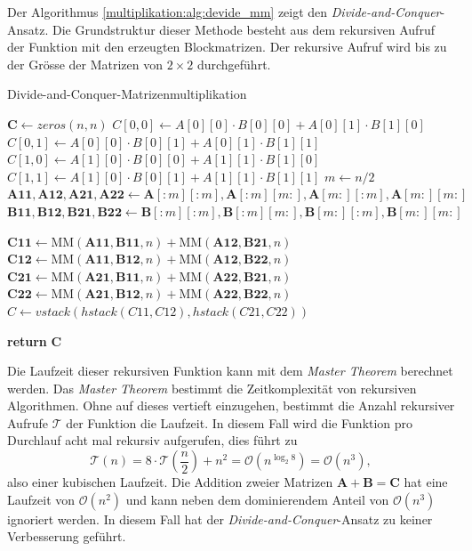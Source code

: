 Der Algorithmus \ref{multiplikation:alg:devide_mm} zeigt den \textit{Divide-and-Conquer}-Ansatz.
Die Grundstruktur dieser Methode besteht aus dem rekursiven Aufruf der Funktion mit den erzeugten Blockmatrizen.
Der rekursive Aufruf wird bis zu der Gr\"osse der Matrizen von $2 \times 2$ durchgef\"uhrt.
\begin{algorithm}\footnotesize\caption{Divide-and-Conquer-Matrizenmultiplikation}
	\setlength{\lineskip}{7pt}
	\label{multiplikation:alg:devide_mm}
	\begin{algorithmic}
		\State  $ \mathbf{C} \gets zeros(n, n)$
		\State  $C[0, 0] \gets  A[0][0]\cdot B[0][0]+A[0][1]\cdot B[1][0]$
		\State  $C[0, 1] \gets  A[0][0]\cdot B[0][1]+A[0][1]\cdot B[1][1]$
		\State  $C[1, 0] \gets  A[1][0]\cdot B[0][0]+A[1][1]\cdot B[1][0]$
		\State  $C[1, 1] \gets  A[1][0]\cdot B[0][1]+A[1][1]\cdot B[1][1]$
		\Else
		\State  $ m \gets n/2$
		\State $\mathbf{A11}, \mathbf{A12}, \mathbf{A21}, \mathbf{A22} \gets \mathbf{A}[:m][:m], \mathbf{A}[:m][m:], \mathbf{A}[m:][:m], \mathbf{A}[m:][m:]$
		\State $\mathbf{B11}, \mathbf{B12}, \mathbf{B21}, \mathbf{B22} \gets \mathbf{B}[:m][:m], \mathbf{B}[:m][m:], \mathbf{B}[m:][:m], \mathbf{B}[m:][m:]$

		\State $\mathbf{C11} \gets \text{MM}(\mathbf{A11}, \mathbf{B11},n) + \text{MM}(\mathbf{A12}, \mathbf{B21},n)$
		\State $\mathbf{C12} \gets \text{MM}(\mathbf{A11},\mathbf{B12},n) + \text{MM}(\mathbf{A12}, \mathbf{B22},n)$
		\State $\mathbf{C21} \gets \text{MM}(\mathbf{A21}, \mathbf{B11},n) + \text{MM}(\mathbf{A22}, \mathbf{B21},n)$
		\State $\mathbf{C22} \gets \text{MM}(\mathbf{A21}, \mathbf{B12},n) + \text{MM}(\mathbf{A22}, \mathbf{B22},n)$
		\State $  C \gets vstack(hstack(C11, C12), hstack(C21, C22))$

		\EndIf
		\State \textbf{return} $\textbf{C}$

		\EndFunction
	\end{algorithmic}
\end{algorithm}

Die Laufzeit dieser rekursiven Funktion kann mit dem \textit{Master Theorem} \cite{multiplikation:master_theorem} berechnet werden. Das \textit{Master Theorem} bestimmt die Zeitkomplexit\"at von rekursiven Algorithmen.
%
Ohne auf dieses vertieft einzugehen, bestimmt die Anzahl rekursiver Aufrufe $\mathcal{T} $ der Funktion die Laufzeit.
%
%
In diesem Fall wird die Funktion pro Durchlauf acht mal rekursiv aufgerufen, dies f\"uhrt zu
\begin{equation} \label{multiplikation:eq:laufzeitdac}
	\mathcal{T}(n) =	8 \cdot \mathcal{T} \left(\frac{n}{2}\right ) + n^2  = \mathcal{O}(n^{\log_2 8}) = \mathcal{O}  (n^{3} ),
\end{equation}
also einer kubischen Laufzeit.
%
%
Die Addition zweier Matrizen $\mathbf{A} + \mathbf{B} = \mathbf{C}$ hat eine Laufzeit von $\mathcal{O}(n^{2})$ und kann neben dem dominierendem Anteil von $\mathcal{O}(n^{3})$ ignoriert werden.
In diesem Fall hat der \textit{Divide-and-Conquer}-Ansatz zu keiner Verbesserung gef\"uhrt.


